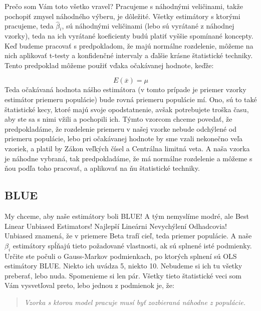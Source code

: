 \documentclass[]{article}
\begin{document}
Prečo som Vám toto všetko vravel? Pracujeme s náhodnými veličinami,
takže pochopiť zmysel náhodného výberu, je dôležité. Všetky estimátory s
ktorými pracujeme, teda \(\hat\beta{}_i\), sú náhodnými veličinami (lebo
sú vyrátané z náhodnej vzorky), teda na ich vyrátané koeficienty budú
platiť vyššie spomínané koncepty. Keď budeme pracovať s predpokladom, že
majú normálne rozdelenie, môžeme na nich aplikovať t-testy a konfidenčné
intervaly a ďalšie krásne štatistické techniky. Tento predpoklad môžeme
použiť vďaka očakávanej hodnote, keďže:

\[E(\overline{x}) = \mu\] Teda očakávaná hodnota nášho estimátora (v
tomto prípade je priemer vzorky estimátor priemeru populácie) bude rovná
priemeru populácie mí. Ono, sú to také štatistické kecy, ktoré majú
svoje opodstatnenie, avšak potrebujete troška času, aby ste sa s nimi
vžili a pochopili ich. Týmto vzorcom chceme povedať, že predpokladáme,
že rozdelenie priemeru v našej vzorke nebude odchýlené od priemeru
populácie, lebo pri očakávanej hodnote by sme vzali nekonečno veľa
vzoriek, a platil by Zákon veľkých čísel a Centrálna limitná veta. A
naša vzorka je náhodne vybraná, tak predpokladáme, že má normálne
rozdelenie a môžeme s ňou podľa toho pracovať, a aplikovať na ňu
štatistické techniky.

\hypertarget{blue}{%
\subsection{BLUE}\label{blue}}

My chceme, aby naše estimátory boli BLUE! A tým nemyslíme modré, ale
Best Linear Unbiased Estimators! Najlepší Lineárni Nevychýlení
Odhadcovia! Unbiased znamená, že v priemere Beta trafí cieľ, teda
priemer populácie. A naše \(\beta_i\) estimátory spĺňajú tieto
požadované vlastnosti, ak sú splnené isté podmienky. Určite ste počuli o
Gauss-Markov podmienkach, po ktorých splnení sú OLS estimátory BLUE.
Niekto ich uvádza 5, niekto 10. Nebudeme si ich tu všetky preberať, lebo
nuda. Spomenieme si len pár. Všetky tieto štatistické veci som Vám
vysvetľoval preto, lebo jednou z podmienok je, že:

\begin{center}

\begin{quote}
\emph{Vzorka s ktorou model pracuje musí byť zozbieraná náhodne z
populácie.}
\end{quote}

\end{center}
\end{document}
